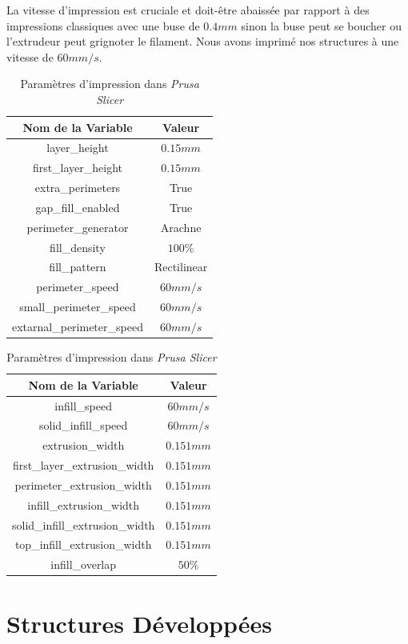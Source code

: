 \documentclass[a4paper]{article}
\begin{document}
	La vitesse d'impression est cruciale et doit-être abaissée par rapport à des impressions classiques avec une buse de $0.4 mm$ sinon la buse peut se boucher ou l'extrudeur peut grignoter le filament. Nous avons imprimé nos structures à une vitesse de $60 mm/s$.
	
	\begin{table}[h]
		\centering
		\begin{tabular}{|c|c|}
			\hline
			\rowcolor{Gray}
			\textbf{Nom de la Variable} & \textbf{Valeur}\\
			\hline\hline
			layer\_height & $0.15 mm$\\
			first\_layer\_height & $0.15 mm$\\
			extra\_perimeters & True\\
			gap\_fill\_enabled & True\\
			perimeter\_generator & Arachne\\
			fill\_density & $100 \%$\\
			fill\_pattern & Rectilinear\\
			perimeter\_speed & $60 mm/s$\\
			small\_perimeter\_speed & $60 mm/s$\\
			extarnal\_perimeter\_speed & $60 mm/s$\\
			\hline
		\end{tabular}
		\begin{tabular}{|c|c|}
			\hline
			\rowcolor{Gray}
			\textbf{Nom de la Variable} & \textbf{Valeur}\\
			\hline\hline
			infill\_speed & $60 mm/s$\\
			solid\_infill\_speed & $60 mm/s$\\
			extrusion\_width & $0.151 mm$\\
			first\_layer\_extrusion\_width & $0.151 mm$\\
			perimeter\_extrusion\_width & $0.151 mm$\\
			infill\_extrusion\_width & $0.151 mm$\\
			solid\_infill\_extrusion\_width & $0.151 mm$\\
			top\_infill\_extrusion\_width & $0.151 mm$\\
			infill\_overlap & $50 \%$\\
			\hline
		\end{tabular}
		\caption{Paramètres d'impression dans \textit{Prusa Slicer}}
	\end{table}
	
	\newpage
	
	\section{Structures Développées}
\end{document}
